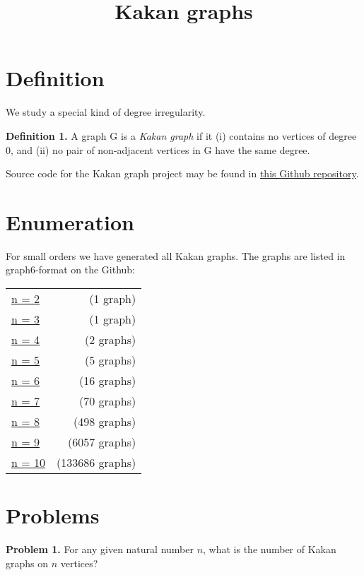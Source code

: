 \documentclass{article}
\title{Kakan graphs}
\begin{document}
\section{Definition}

We study a special kind of degree irregularity.

{\bf Definition 1.} A graph G is a \emph{Kakan graph} if it (i) contains no vertices of degree 0, and (ii) no pair of non-adjacent vertices in G have the same degree.

Source code for the Kakan graph project may be found in \href{https://github.com/tbk1988/kakangraphs}{this Github repository}.

\section{Enumeration}

For small orders we have generated all Kakan graphs. The graphs are listed in graph6-format on the Github:

\begin{tabular}{lr}
  \href{https://github.com/tbk1988/kakangraphs/blob/main/graphs/kakan_n2.g6}{n = 2} & (1 graph) \\
  \href{https://github.com/tbk1988/kakangraphs/blob/main/graphs/kakan_n3.g6}{n = 3} & (1 graph) \\
  \href{https://github.com/tbk1988/kakangraphs/blob/main/graphs/kakan_n4.g6}{n = 4} & (2 graphs) \\
  \href{https://github.com/tbk1988/kakangraphs/blob/main/graphs/kakan_n5.g6}{n = 5} & (5 graphs) \\
  \href{https://github.com/tbk1988/kakangraphs/blob/main/graphs/kakan_n6.g6}{n = 6} & (16 graphs) \\
  \href{https://github.com/tbk1988/kakangraphs/blob/main/graphs/kakan_n7.g6}{n = 7} & (70 graphs) \\
  \href{https://github.com/tbk1988/kakangraphs/blob/main/graphs/kakan_n8.g6}{n = 8} & (498 graphs) \\
  \href{https://github.com/tbk1988/kakangraphs/blob/main/graphs/kakan_n9.g6}{n = 9} & (6057 graphs) \\
  \href{https://github.com/tbk1988/kakangraphs/blob/main/graphs/kakan_n10.g6}{n = 10} & (133686 graphs)
\end{tabular}

\section{Problems}

{\bf Problem 1.} For any given natural number $n$, what is the number of Kakan graphs on $n$ vertices?
\end{document}
